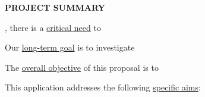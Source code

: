 {\noindent \bf \Large PROJECT SUMMARY}






\xx, there is a \ul{critical need} to \xx

Our \ul{long-term goal} is to investigate \xx

The \ul{overall objective} of this proposal is to \xx

This application addresses the following \ul{specific aims}: